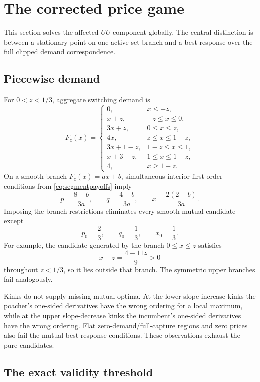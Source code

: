 \section{The corrected price game}\label{sec:price}

This section solves the affected \(UU\) component globally.  The central distinction is between a stationary point on one active-set branch and a best response over the full clipped demand correspondence.

\subsection{Piecewise demand}

For \(0<z<1/3\), aggregate switching demand is
\[
F_z(x)=
\begin{cases}
0,&x\le -z,\\
x+z,&-z\le x\le0,\\
3x+z,&0\le x\le z,\\
4x,&z\le x\le1-z,\\
3x+1-z,&1-z\le x\le1,\\
x+3-z,&1\le x\le1+z,\\
4,&x\ge1+z.
\end{cases}
\]
On a smooth branch \(F_z(x)=ax+b\), simultaneous interior first-order conditions from \eqref{eq:segmentpayoffs} imply
\begin{equation}
p=\frac{8-b}{3a},
\qquad
q=\frac{4+b}{3a},
\qquad
x=\frac{2(2-b)}{3a}.
\label{eq:smoothcandidate}
\end{equation}
Imposing the branch restrictions eliminates every smooth mutual candidate except
\[
p_0=\frac23,\qquad q_0=\frac13,\qquad x_0=\frac13.
\]
For example, the candidate generated by the branch \(0\le x\le z\) satisfies
\[
x-z=\frac{4-11z}{9}>0
\]
throughout \(z<1/3\), so it lies outside that branch.  The symmetric upper branches fail analogously.

Kinks do not supply missing mutual optima.  At the lower slope-increase kinks the poacher's one-sided derivatives have the wrong ordering for a local maximum, while at the upper slope-decrease kinks the incumbent's one-sided derivatives have the wrong ordering.  Flat zero-demand/full-capture regions and zero prices also fail the mutual-best-response conditions.  These observations exhaust the pure candidates.

\subsection{The exact validity threshold}

